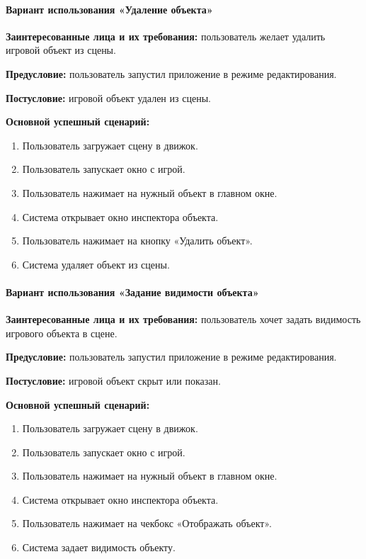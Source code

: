 \paragraph{Вариант использования «Удаление объекта»}
\textbf{Заинтересованные лица и их требования:} пользователь желает удалить игровой объект из сцены.

\textbf{Предусловие:} пользователь запустил приложение в режиме редактирования.

\textbf{Постусловие:} игровой объект удален из сцены.

\textbf{Основной успешный сценарий:}

\begin{enumerate}
	\item Пользователь загружает сцену в движок.
	
	\item Пользователь запускает окно с игрой.
	
	\item Пользователь нажимает на нужный объект в главном окне.
	
	\item Система открывает окно инспектора объекта.
	
	\item Пользователь нажимает на кнопку «Удалить объект».
	
	\item Система удаляет объект из сцены.
\end{enumerate}

\paragraph{Вариант использования «Задание видимости объекта»}
\textbf{Заинтересованные лица и их требования:} пользователь хочет задать видимость игрового объекта в сцене.

\textbf{Предусловие:} пользователь запустил приложение в режиме редактирования.

\textbf{Постусловие:} игровой объект скрыт или показан.

\textbf{Основной успешный сценарий:}

\begin{enumerate}
	\item Пользователь загружает сцену в движок.
	
	\item Пользователь запускает окно с игрой.
	
	\item Пользователь нажимает на нужный объект в главном окне.
	
	\item Система открывает окно инспектора объекта.
	
	\item Пользователь нажимает на чекбокс «Отображать объект».
	
	\item Система задает видимость объекту.
\end{enumerate}

